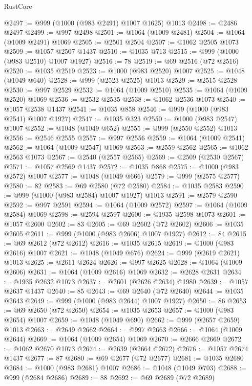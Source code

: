 \begin{lexlean}{RustCore}
\begin{coremodule}
@2497 := @999 (@1000 (@983 @2491) @1007 @1625) @1013
@2498 := @2486 @2497
@2499 := @997 @2498
@2501 := @1064 (@1009 @2481)
@2504 := @1064 (@1009 @2491) @1069
@2505 := @2501 @2504
@2507 := @1062 @2505 @1073
@2509 := @1057 @2507 @1437
@2510 := @1035 @713
@2515 := @999 (@1000 (@983 @2510) @1007 @1927)
@2516 := 78
@2519 := @69 @2516 (@72 @2516)
@2520 := @1035 @2519
@2523 := @1000 (@983 @2520) @1007
@2525 := @1048 (@1049 @640)
@2528 := @999 (@2523 @2525) @1013
@2529 := @2515 @2528
@2530 := @997 @2529
@2532 := @1064 (@1009 @2510)
@2535 := @1064 (@1009 @2520) @1069
@2536 := @2532 @2535
@2538 := @1062 @2536 @1073
@2540 := @1057 @2538 @1437
@2541 := @1035 @858
@2546 := @999 (@1000 (@983 @2541) @1007 @1927)
@2547 := @1035 @323
@2550 := @1000 (@983 @2547) @1007
@2552 := @1048 (@1049 @652)
@2555 := @999 (@2550 @2552) @1013
@2556 := @2546 @2555
@2557 := @997 @2556
@2559 := @1064 (@1009 @2541)
@2562 := @1064 (@1009 @2547) @1069
@2563 := @2559 @2562
@2565 := @1062 @2563 @1073
@2567 := @2540 (@2557 @2565)
@2569 := @2509 (@2530 @2567)
@2571 := @1057 @2569 @1437
@2572 := @1035 @868
@2575 := @1000 (@983 @2572) @1007
@2577 := @1048 (@1049 @666)
@2579 := @999 (@2575 @2577)
@2580 := 82
@2583 := @69 @2580 (@72 @2580)
@2584 := @1035 @2583
@2590 := @999 (@1000 (@983 @2584) @1007 @1927) @1013
@2591 := @2579 @2590
@2592 := @997 @2591
@2594 := @1064 (@1009 @2572)
@2597 := @1064 (@1009 @2584) @1069
@2598 := @2594 @2597
@2600 := @1935 @2598 @1073
@2601 := @1057 @2600
@2602 := 83
@2605 := @69 @2602 (@72 @2602)
@2606 := @1035 @2605
@2611 := @999 (@1000 (@983 @2606) @1007 @1927)
@2612 := 84
@2615 := @69 @2612 (@72 @2612)
@2616 := @1035 @2615
@2619 := @1000 (@983 @2616) @1007
@2621 := @1048 (@1049 @676)
@2624 := @999 (@2619 @2621) @1013
@2625 := @2611 @2624
@2626 := @997 @2625
@2628 := @1064 (@1009 @2606)
@2631 := @1064 (@1009 @2616) @1069
@2632 := @2628 @2631
@2634 := @1935 @2632 @1073
@2637 := @2601 (@2626 @2634) @1980
@2639 := @1057 @2637 @1437
@2640 := 85
@2643 := @69 @2640 (@72 @2640)
@2644 := @1035 @2643
@2649 := @999 (@1000 (@983 @2644) @1007 @1927)
@2650 := 86
@2653 := @69 @2650 (@72 @2650)
@2654 := @1035 @2653
@2657 := @1000 (@983 @2654) @1007
@2659 := @1048 (@1049 @690)
@2662 := @999 (@2657 @2659) @1013
@2663 := @2649 @2662
@2664 := @997 @2663
@2666 := @1064 (@1009 @2644)
@2669 := @1064 (@1009 @2654) @1069
@2670 := @2666 @2669
@2672 := @1062 @2670 @1073
@2674 := @2639 (@2664 @2672)
@2676 := @1057 @2674 @1437
@2677 := 87
@2680 := @69 @2677 (@72 @2677)
@2681 := @1035 @2680
@2684 := @1000 (@983 @2681) @1007
@2686 := @1048 (@1049 @703)
@2688 := @999 (@2684 @2686)
@2689 := 88
@2692 := @69 @2689 (@72 @2689)

\end{coremodule}
\end{lexlean}
